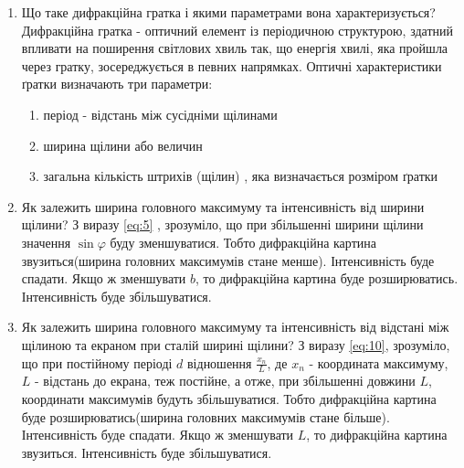 \begin{enumerate}
    \item Що таке дифракційна гратка і якими параметрами вона характеризується?
    \bigbreak
    Дифракційна гратка - оптичний елемент із періодичною 
    структурою, здатний впливати на поширення світлових хвиль так,
    що енергія хвилі, яка пройшла через гратку, зосереджується 
    в певних напрямках.  Оптичні характеристики ґратки визначають три параметри:
    \begin{enumerate}
        \item період - відстань між сусідніми щілинами
        \item ширина щілини або величин
        \item загальна кількість штрихів (щілин) , яка визначається розміром ґратки
    \end{enumerate}    


    \item Як залежить ширина головного максимуму та інтенсивність від ширини щілини?
    \bigbreak
    З виразу  \ref{eq:5} , зрозуміло, що при збільшенні
    ширини щілини значення $\sin \varphi$ буду зменшуватися.
    Тобто дифракційна картина звузиться(ширина головних максимумів стане менше).
    Інтенсивність буде спадати.
    Якщо ж зменшувати $b$, то дифракційна 
    картина буде розширюватись. Інтенсивність буде збільшуватися.

    \item Як залежить ширина головного максимуму та інтенсивність від відстані між щілиною та екраном при сталій ширині щілини?
    \bigbreak
    З виразу  \ref{eq:10}, зрозуміло, що при постійному періоді $d$
    відношення $\frac{x_n}{L}$, де $x_n$ - координата максимуму,
    $L$ - відстань до екрана, теж постійне, а отже, при збільшенні довжини
    $L$, координати максимумів будуть збільшуватися. 
    Тобто дифракційна картина буде розширюватись(ширина головних максимумів стане більше). 
    Інтенсивність буде спадати.
    Якщо ж зменшувати $L$, то дифракційна картина звузиться.
    Інтенсивність буде збільшуватися.

    
\end{enumerate}